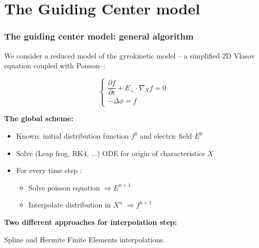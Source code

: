 \documentclass[]{beamer}
\begin{document}
\section{The Guiding Center model} 
\begin{frame}
	\frametitle{The guiding center model: general algorithm}

	We consider a reduced model of the gyrokinetic model -- a simplified 2D Vlasov equation coupled with Poisson--:  
	
	\begin{equation}
	\left\{
	\begin{array}{lr}
	\dfrac{\partial f}{\partial t} + E_{\perp} \cdot \nabla_X f = 0\\
	- \Delta \phi = f
	\end{array}
	\right.
	\end{equation}
	
	\textbf{The global scheme:}

	\begin{itemize}
		\item Known: initial distribution function $f^0$ and electric field $E^0$
		\item Solve (Leap frog, RK4, ...) ODE for origin of characteristics $X$
		\item For every time step :
			\begin{itemize}
				\item Solve poisson equation $\Rightarrow E^{n+1}$
				\item Interpolate distribution in $X^{n}$ $\Rightarrow f^{n+1}$
			\end{itemize}
	\end{itemize}

\textbf{Two different approaches for interpolation step:} 

Spline and Hermite Finite Elements interpolations.

\end{frame}
\end{document}
